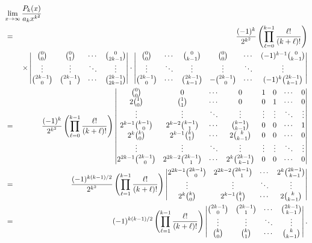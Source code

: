 \documentclass[12pt,letterpaper]{amsart}
\theoremstyle{plain}
\theoremstyle{definition}
\theoremstyle{remark}
\numberwithin{equation}{subsection}
\numberwithin{theorem}{subsection}
\numberwithin{table}{subsection}
\begin{document}
\begin{eqnarray*}
&\displaystyle{\lim_{x\rightarrow \infty}
\frac{P_k(x)}{a_k x^{k^2}} \hskip -0.5in }& \nonumber \\
&=&\frac{(-1)^{k}}{2^{k^2}} \left( \prod_{\ell=0}^{k-1} \frac{\ell!}{(k+\ell)!}
\right) \nonumber \\
& &\times
     \vmatrix \binom{0}{0} & \binom{0}{1} & \cdots & \binom{0}{2k-1} \nonumber  \\
\vdots & \vdots & \ddots & \vdots
\\ \binom{2k-1}{0} & \binom{2k-1}{1} & \cdots &
\binom{2k-1}{2k-1} \endvmatrix \cdot \vmatrix \binom{0}{0} &
\cdots & \binom{0}{k-1} & \binom{0}{0} & \cdots &
(-1)^{k-1}\binom{0}{k-1}
\\ \vdots & \ddots & \vdots & \vdots & \ddots & \vdots \\
\binom{2k-1}{0} & \cdots & \binom{2k-1}{k-1} & -\binom{2k-1}{0} &
\cdots & (-1)^k\binom{2k-1}{k-1}
\endvmatrix \nonumber  \\
&=&
\frac{(-1)^{k}}{2^{k^2}} \left( \prod_{\ell=0}^{k-1} \frac{\ell!}{(k+\ell)!}
\right)\vmatrix \binom{0}{0} & 0 & \cdots & 0 & 1& 0& \cdots & 0
\\ 2\binom{1}{0} & \binom{1}{1} & \cdots & 0 & 0 & 1 & \cdots &
0\\ \vdots & \vdots & \ddots & \vdots & \vdots & \vdots & \ddots &
\vdots \\ 2^{k-1} \binom{k-1}{0} & 2^{k-2}\binom{k-1}{1} & \cdots
& \binom{k-1}{k-1} & 0& 0& \cdots &1 \\ 2^{k}\binom{k}{0} &
2^{k-1}\binom{k}{1} & \cdots & 2\binom{k}{k-1} & 0&0&\cdots &0
\\
\vdots & \vdots & \ddots & \vdots & \vdots & \vdots & \ddots &
\vdots \\ 2^{2k-1}\binom{2k-1}{0} & 2^{2k-2}\binom{2k-1}{1} &
\cdots & 2^{k}\binom{2k-1}{k-1} & 0& 0& \cdots &0
\endvmatrix \nonumber \\
 &=&
\frac{(-1)^{k(k-1)/2}}{2^{k^2}} \left( \prod_{\ell=1}^{k-1}
\frac{\ell!}{(k+\ell)!}\right) \vmatrix 2^{2k-1}\binom{2k-1}{0} &
2^{2k-2}\binom{2k-1}{1} &\cdots & 2^{k}\binom{2k-1}{k-1} \\
\vdots & \vdots & \ddots & \vdots \\ 2^k\binom{k}{0} &
2^{k-1}\binom{k}{1} &\cdots & 2\binom{k}{k-1} \endvmatrix \nonumber \\
&=&
(-1)^{k(k-1)/2} \left( \prod_{\ell=1}^{k-1}
\frac{\ell!}{(k+\ell)!}\right)\vmatrix \binom{2k-1}{0} &
\binom{2k-1}{1} &\cdots & \binom{2k-1}{k-1} \\
\vdots & \vdots & \ddots & \vdots \\ \binom{k}{0} & \binom{k}{1}
&\cdots & \binom{k}{k-1} \endvmatrix.
 \end{eqnarray*}
\end{document}
